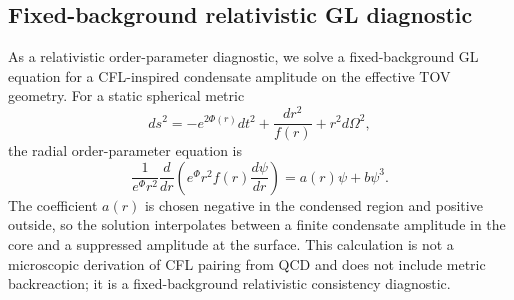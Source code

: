 \subsection{Fixed-background relativistic GL diagnostic}
\label{sec:relativistic_gl_diagnostic}

As a relativistic order-parameter diagnostic, we solve a fixed-background GL
equation for a CFL-inspired condensate amplitude on the effective TOV geometry.
For a static spherical metric
\[
ds^2=-e^{2\Phi(r)}dt^2+\frac{dr^2}{f(r)}+r^2d\Omega^2,
\]
the radial order-parameter equation is
\[
\frac{1}{e^{\Phi}r^2}\frac{d}{dr}
\left(e^{\Phi}r^2 f(r)\frac{d\psi}{dr}\right)
=
a(r)\psi+b\psi^3 .
\]
The coefficient \(a(r)\) is chosen negative in the condensed region and positive
outside, so the solution interpolates between a finite condensate amplitude in
the core and a suppressed amplitude at the surface. This calculation is not a
microscopic derivation of CFL pairing from QCD and does not include metric
backreaction; it is a fixed-background relativistic consistency diagnostic.
